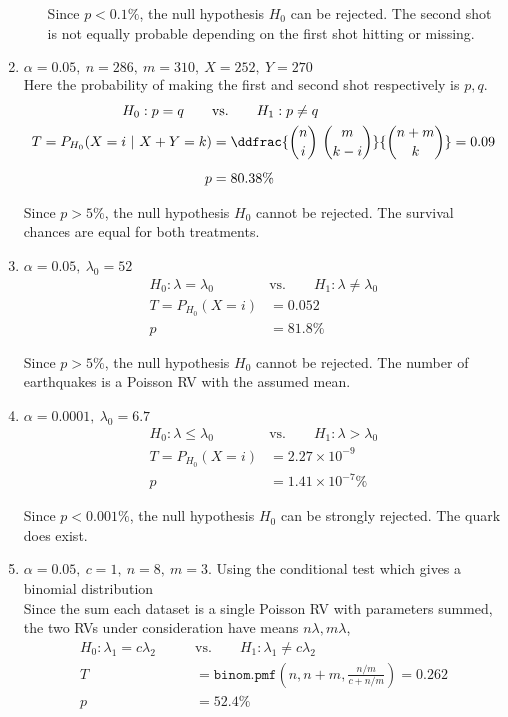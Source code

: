 \begin{enumerate}
\begin{enumerate}
		Since $ p < 0.1\% $, the null hypothesis $ H_0 $ can be rejected. The second shot is not equally probable depending on the first shot hitting or missing.	
	
	\end{enumerate}
	
	\item $\alpha = 0.05,\ n = 286,\ m = 310,\ X = 252,\ Y = 270$\\
	Here the probability of making the first and second shot respectively is $ p, q $.
	\begin{align}
		H_0 : p = q \qquad &\text{vs.} \qquad H_1 : p  \neq q \nonumber \\
		T = P_{H_0}(X = i\ |\ X+Y = k) &= \ddfrac{\binom{n}{i}\ \binom{m}{k-i}}{\binom{n+m}{k}} = 0.09 \nonumber \\[1ex]
		p &= 80.38\%
	\end{align}
	
	Since $ p > 5\% $, the null hypothesis $ H_0 $ cannot be rejected. The survival chances are equal for both treatments.
	
	\item $\alpha = 0.05,\ \lambda_0 = 52$\\
	\begin{align}
		H_0 : \lambda = \lambda_0 \qquad &\text{vs.} \qquad H_1 : \lambda \neq \lambda_0 \nonumber \\
		T = P_{H_0}(X = i) &= 0.052 \nonumber \\[1ex]
		p &= 81.8\%
	\end{align}
	
	Since $ p > 5\% $, the null hypothesis $ H_0 $ cannot be rejected. The number of earthquakes is a Poisson RV with the assumed mean.
	
	\item $\alpha = 0.0001,\ \lambda_0 = 6.7$\\
	\begin{align}
		H_0 : \lambda \leq \lambda_0 \qquad &\text{vs.} \qquad H_1 : \lambda > \lambda_0 \nonumber \\
		T = P_{H_0}(X = i) &= 2.27 \times 10^{-9} \nonumber \\[1ex]
		p &= 1.41 \times 10^{-7}\%
	\end{align}
	
	Since $ p < 0.001\% $, the null hypothesis $ H_0 $ can be strongly rejected. The quark does exist.
	
	
	\item $\alpha = 0.05,\ c = 1,\ n = 8,\ m = 3$. Using the conditional test which gives a binomial distribution\\
	Since the sum each dataset is a single Poisson RV with parameters summed, the two RVs under consideration have means $ n\lambda, m\lambda $,  
	\begin{align}
		H_0 : \lambda_1 = c\lambda_2 \qquad &\text{vs.} \qquad H_1 : \lambda_1 \neq c\lambda_2 \nonumber \\
		T &= \texttt{binom.pmf}\left(n, n+m, \frac{n/m}{c + n/m}\right) = 0.262 \nonumber \\[1ex]
		p &= 52.4\%
	\end{align}
	

\end{enumerate}
